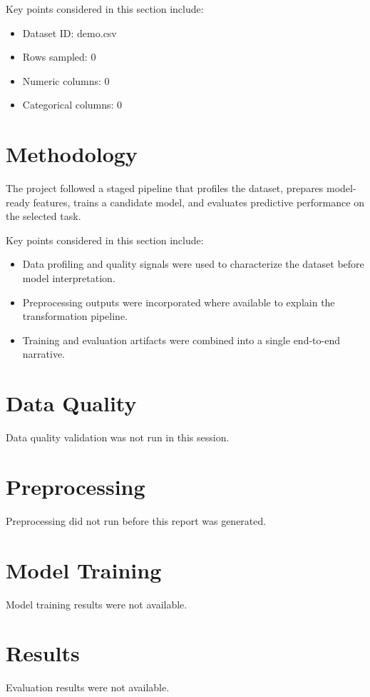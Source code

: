 \documentclass[11pt]{article}
\begin{document}
Key points considered in this section include:

\begin{itemize}
\item Dataset ID: demo.csv
\item Rows sampled: 0
\item Numeric columns: 0
\item Categorical columns: 0
\end{itemize}


\section{Methodology}
The project followed a staged pipeline that profiles the dataset, prepares model-ready features, trains a candidate model, and evaluates predictive performance on the selected task.

Key points considered in this section include:

\begin{itemize}
\item Data profiling and quality signals were used to characterize the dataset before model interpretation.
\item Preprocessing outputs were incorporated where available to explain the transformation pipeline.
\item Training and evaluation artifacts were combined into a single end-to-end narrative.
\end{itemize}


\section{Data Quality}
Data quality validation was not run in this session.

\section{Preprocessing}
Preprocessing did not run before this report was generated.

\section{Model Training}
Model training results were not available.

\section{Results}
Evaluation results were not available.
\end{document}
